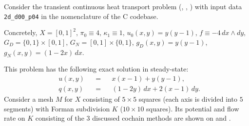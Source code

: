 \begin{example}
  \label{cmc/diffusion/continuous/transient/examples/2d_d00_p04-example}
  Consider the transient continuous heat transport problem
  (,
   ,
   )
  with input data \verb|2d_d00_p04| in the nomenclature of the C codebase.

  Concretely,
    $X = [0, 1]^2$,
    $\pi_0 \equiv 4$,
    $\kappa_1 \equiv 1$,
    $u_0(x, y) = y (y - 1)$,
    $f \equiv -4\, d x \wedge d y$,
    $G_D = \{0, 1\} \times [0, 1]$,
    $G_N = [0, 1] \times \{0, 1\}$,
    $g_D(x, y) = y (y - 1)$,
    $g_N(x, y) = (1 - 2 x)\, d x$.

  This problem has the following exact solution in steady-state:
  \begin{subequations}
    \begin{alignat}{3}
      & u(x, y) && = && x (x - 1) + y ( y - 1), \\
      & q(x, y) && = && (1 - 2 y)\, d x + 2 (x - 1)\, d y.
    \end{alignat}
  \end{subequations}
  Consider a mesh $M$ for $X$ consisting of $5 \times 5$ squares (each axis is
  divided into $5$ segments) with Forman subdivision $K$
  ($10 \times 10$ squares).
  Its potential and flow rate on $K$ consisting of the $3$ discussed cochain
  methods are shown on
  and
  .
\end{example}
